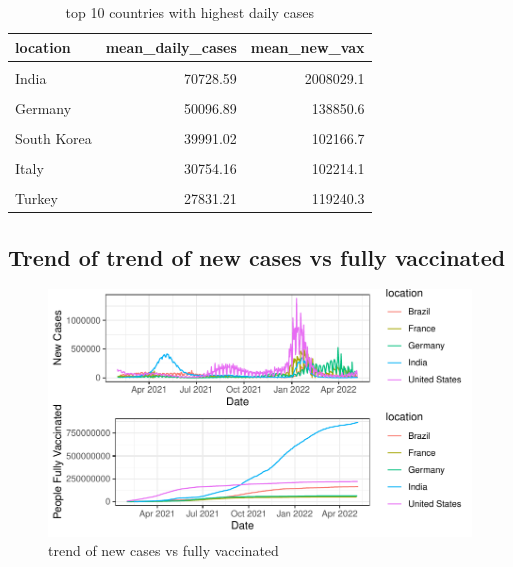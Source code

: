 \documentclass[11pt,a4paper,]{article}
\begin{document}
\begin{table}[!h]

\caption{\label{tab:table3}top 10 countries with highest daily cases}
\centering
\begin{tabular}[t]{lrr}
\toprule
location & mean\_daily\_cases & mean\_new\_vax\\
\midrule
\cellcolor{gray!6}{United States} & \cellcolor{gray!6}{120484.50} & \cellcolor{gray!6}{460807.1}\\
India & 70728.59 & 2008029.1\\
\cellcolor{gray!6}{France} & \cellcolor{gray!6}{56648.85} & \cellcolor{gray!6}{114807.6}\\
Germany & 50096.89 & 138850.6\\
\cellcolor{gray!6}{Brazil} & \cellcolor{gray!6}{46861.09} & \cellcolor{gray!6}{372419.6}\\
\addlinespace
South Korea & 39991.02 & 102166.7\\
\cellcolor{gray!6}{United Kingdom} & \cellcolor{gray!6}{38446.46} & \cellcolor{gray!6}{110154.3}\\
Italy & 30754.16 & 102214.1\\
\cellcolor{gray!6}{Russia} & \cellcolor{gray!6}{29094.76} & \cellcolor{gray!6}{203228.0}\\
Turkey & 27831.21 & 119240.3\\
\bottomrule
\end{tabular}
\end{table}

\subsection*{Trend of trend of new cases vs fully vaccinated}

\begin{figure}

{\centering \includegraphics{report_files/figure-latex/figure4-1} 

}

\caption{trend of new cases vs fully vaccinated}\label{fig:figure4}
\end{figure}
\end{document}
